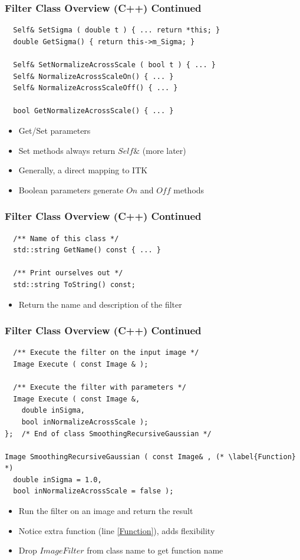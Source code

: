 \begin{frame}[fragile]
\frametitle{Filter Class Overview (C++) Continued}
\lstcpp
\begin{lstlisting}
  Self& SetSigma ( double t ) { ... return *this; }
  double GetSigma() { return this->m_Sigma; }

  Self& SetNormalizeAcrossScale ( bool t ) { ... }
  Self& NormalizeAcrossScaleOn() { ... }
  Self& NormalizeAcrossScaleOff() { ... }

  bool GetNormalizeAcrossScale() { ... }
\end{lstlisting}
\begin{itemize}
  \item Get/Set parameters
  \item Set methods always return $Self\&$ (more later)
  \item Generally, a direct mapping to ITK
  \item Boolean parameters generate $On$ and $Off$ methods
\end{itemize}
\end{frame}


\begin{frame}[fragile]
\frametitle{Filter Class Overview (C++) Continued}
\lstcpp
\begin{lstlisting}
  /** Name of this class */
  std::string GetName() const { ... }

  /** Print ourselves out */
  std::string ToString() const;
\end{lstlisting}
\begin{itemize}
  \item Return the name and description of the filter
\end{itemize}
\end{frame}


\begin{frame}[fragile]
\frametitle{Filter Class Overview (C++) Continued}
\lstcpp
\begin{lstlisting}
  /** Execute the filter on the input image */
  Image Execute ( const Image & );

  /** Execute the filter with parameters */
  Image Execute ( const Image &,
    double inSigma,
    bool inNormalizeAcrossScale );
};  /* End of class SmoothingRecursiveGaussian */

Image SmoothingRecursiveGaussian ( const Image& , (* \label{Function} *)
  double inSigma = 1.0,
  bool inNormalizeAcrossScale = false );

\end{lstlisting}
\begin{itemize}
  \item Run the filter on an image and return the result
  \item Notice extra function (line \ref{Function}), adds flexibility
  \item Drop $ImageFilter$ from class name to get function name
\end{itemize}

\end{frame}

